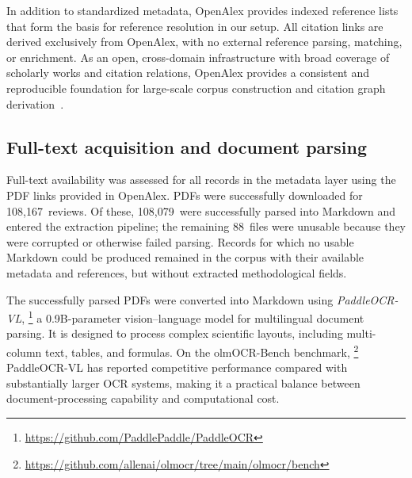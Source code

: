 
In addition to standardized metadata, OpenAlex provides indexed reference lists that form the basis for reference resolution in our setup. All citation links are derived exclusively from OpenAlex, with no external reference parsing, matching, or enrichment. As an open, cross-domain infrastructure with broad coverage of scholarly works and citation relations, OpenAlex provides a consistent and reproducible foundation for large-scale corpus construction and citation graph derivation~\cite{culbert2025openalexrefcoverage}.



\subsection*{Full-text acquisition and document parsing}
Full-text availability was assessed for all records in the metadata layer using the PDF links provided in OpenAlex. PDFs were successfully downloaded for 108,167~reviews. Of these, 108,079~were successfully parsed into Markdown and entered the extraction pipeline; the remaining 88~files were unusable because they were corrupted or otherwise failed parsing. Records for which no usable Markdown could be produced remained in the corpus with their available metadata and references, but without extracted methodological fields.

The successfully parsed PDFs were converted into Markdown using \textit{PaddleOCR-VL},%
\footnote{\url{https://github.com/PaddlePaddle/PaddleOCR}}
a 0.9B-parameter vision--language model for multilingual document parsing. It is designed to process complex scientific layouts, including multi-column text, tables, and formulas. On the olmOCR-Bench benchmark,%
\footnote{\url{https://github.com/allenai/olmocr/tree/main/olmocr/bench}}
PaddleOCR-VL has reported competitive performance compared with substantially larger OCR systems, making it a practical balance between document-processing capability and computational cost.

